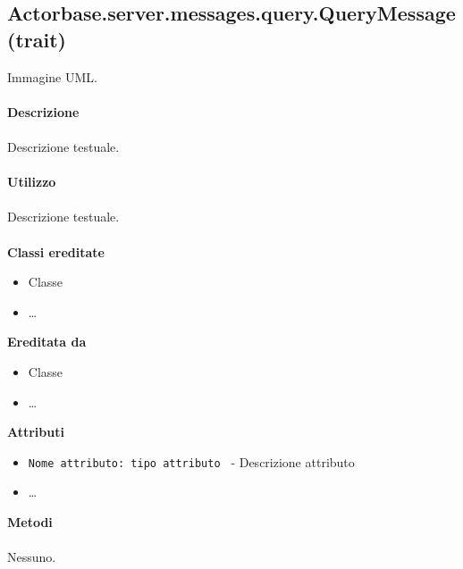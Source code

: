 \documentclass[a4paper]{article}
\begin{document}
	\subsection{Actorbase.server.messages.query.QueryMessage (trait)}
		Immagine UML.
		\\ \\
		\textbf{Descrizione}
			\\ \\
			Descrizione testuale.
			\\ \\
		\textbf{Utilizzo}
			\\ \\
			Descrizione testuale.
			\\ \\
		\textbf{Classi ereditate}
			\begin{itemize}
				\item Classe
				\item \dots
			\end{itemize}
		\textbf{Ereditata da}
			\begin{itemize}
				\item Classe
				\item \dots
			\end{itemize}
		\textbf{Attributi}
			\begin{itemize}
				\item \texttt{Nome attributo: tipo attributo } - Descrizione attributo
				\item \dots
			\end{itemize}
		\textbf{Metodi}
			\\ \\
			Nessuno.
			
\end{document}
